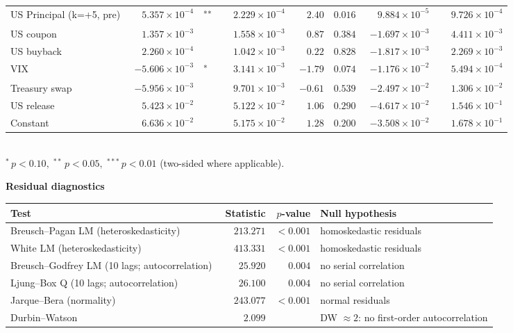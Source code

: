 \documentclass[10pt]{article}
\begin{document}
\begin{tabular}{@{}l|r@{}l rrr rr@{}}
US Principal (k=+5, pre) & $\phantom{-}5.357\!\times\!10^{-4}$ & \textsuperscript{**} & $\phantom{-}2.229\!\times\!10^{-4}$ & $\phantom{-}2.40$ & $0.016$ & $\phantom{-}9.884\!\times\!10^{-5}$ & $\phantom{-}9.726\!\times\!10^{-4}$ \\
\addlinespace[0.3em]
US coupon & $\phantom{-}1.357\!\times\!10^{-3}$ & \textsuperscript{} & $\phantom{-}1.558\!\times\!10^{-3}$ & $\phantom{-}0.87$ & $0.384$ & $-1.697\!\times\!10^{-3}$ & $\phantom{-}4.411\!\times\!10^{-3}$ \\
US buyback & $\phantom{-}2.260\!\times\!10^{-4}$ & \textsuperscript{} & $\phantom{-}1.042\!\times\!10^{-3}$ & $\phantom{-}0.22$ & $0.828$ & $-1.817\!\times\!10^{-3}$ & $\phantom{-}2.269\!\times\!10^{-3}$ \\
VIX & $-5.606\!\times\!10^{-3}$ & \textsuperscript{*} & $\phantom{-}3.141\!\times\!10^{-3}$ & $-1.79$ & $0.074$ & $-1.176\!\times\!10^{-2}$ & $\phantom{-}5.494\!\times\!10^{-4}$ \\
Treasury swap & $-5.956\!\times\!10^{-3}$ & \textsuperscript{} & $\phantom{-}9.701\!\times\!10^{-3}$ & $-0.61$ & $0.539$ & $-2.497\!\times\!10^{-2}$ & $\phantom{-}1.306\!\times\!10^{-2}$ \\
US release & $\phantom{-}5.423\!\times\!10^{-2}$ & \textsuperscript{} & $\phantom{-}5.122\!\times\!10^{-2}$ & $\phantom{-}1.06$ & $0.290$ & $-4.617\!\times\!10^{-2}$ & $\phantom{-}1.546\!\times\!10^{-1}$ \\
\addlinespace[0.3em]
Constant & $\phantom{-}6.636\!\times\!10^{-2}$ & \textsuperscript{} & $\phantom{-}5.175\!\times\!10^{-2}$ & $\phantom{-}1.28$ & $0.200$ & $-3.508\!\times\!10^{-2}$ & $\phantom{-}1.678\!\times\!10^{-1}$ \\
\hline
\end{tabular}
\\[0.2em]
{\footnotesize $^{*}\,p<0.10,\;^{**}\,p<0.05,\;^{***}\,p<0.01$ (two-sided where applicable).}
\vspace{0.9em}

\noindent\textbf{Residual diagnostics}\\[0.3em]
\begin{tabular}{@{}l|rr l@{}}
\hline
Test & Statistic & $p$-value & Null hypothesis \\
\hline
Breusch--Pagan LM (heteroskedasticity) & $\phantom{-}213.271$ & $<\!0.001$ & homoskedastic residuals \\
White LM (heteroskedasticity) & $\phantom{-}413.331$ & $<\!0.001$ & homoskedastic residuals \\
Breusch--Godfrey LM (10 lags; autocorrelation) & $\phantom{-}25.920$ & $0.004$ & no serial correlation \\
Ljung--Box Q (10 lags; autocorrelation) & $\phantom{-}26.100$ & $0.004$ & no serial correlation \\
Jarque--Bera (normality) & $\phantom{-}243.077$ & $<\!0.001$ & normal residuals \\
Durbin--Watson & $\phantom{-}2.099$ &  & DW $\approx 2$: no first-order autocorrelation \\
\hline
\end{tabular}
\end{document}
